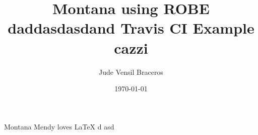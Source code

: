 \documentclass{article}
\title{Montana using ROBE daddasdasdand Travis CI Example cazzi}
\author{Jude Vensil Braceros}
\date{\today}
\begin{document}
\maketitle

Montana Mendy loves LaTeX d asd
\end{document}
